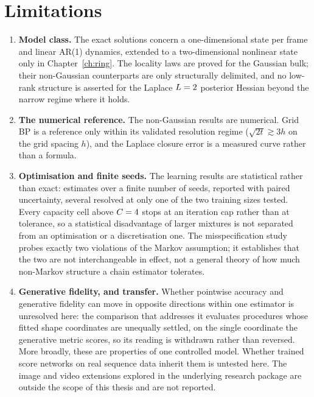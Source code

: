 \section{Limitations}

\begin{enumerate}
  \item \textbf{Model class.} The exact solutions concern a one-dimensional
  state per frame and linear AR(1) dynamics, extended to a two-dimensional
  nonlinear state only in Chapter~\ref{ch:ring}. The locality laws are proved
  for the Gaussian bulk; their non-Gaussian counterparts are only structurally
  delimited, and no low-rank structure is asserted for the Laplace
  $L = 2$ posterior Hessian beyond the narrow regime where it holds.

  \item \textbf{The numerical reference.} The non-Gaussian results are
  numerical. Grid BP is a reference only within its validated resolution regime
  ($\sqrt{2t} \gtrsim 3h$ on the grid spacing $h$), and the Laplace closure
  error is a measured curve rather than a formula.

  \item \textbf{Optimisation and finite seeds.} The learning results are
  statistical rather than exact: estimates over a finite number of seeds,
  reported with paired uncertainty, several resolved at only one of the two
  training sizes tested. Every capacity cell above $C = 4$ stops at
  an iteration cap rather than at tolerance, so a statistical disadvantage of
  larger mixtures is not separated from an optimisation or a discretisation one.
  The misspecification study probes exactly two violations of the Markov
  assumption; it establishes that the two are not interchangeable in effect, not
  a general theory of how much non-Markov structure a chain estimator tolerates.

  \item \textbf{Generative fidelity, and transfer.} Whether pointwise accuracy
  and generative fidelity can move in opposite directions within one estimator
  is unresolved here: the comparison that addresses it evaluates procedures
  whose fitted shape coordinates are unequally settled, on the single coordinate
  the generative metric scores, so its reading is withdrawn rather than
  reversed. More broadly, these are properties of one controlled model. Whether
  trained score networks on real sequence data inherit them is untested here.
  The image and video extensions explored in the underlying research package are
  outside the scope of this thesis and are not reported.
\end{enumerate}

